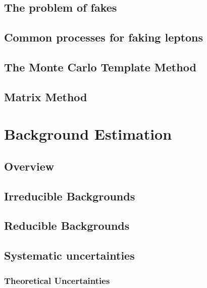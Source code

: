 \documentclass{outhesis}
\begin{document}
\section{The problem of fakes}\label{sec:fake.prob}

\section{Common processes for faking leptons}\label{sec:fake.proc}

\section{The Monte Carlo Template Method}\label{sec:fake.mct}

\section{Matrix Method}\label{sec:fake.mxm}


\chapter{Background Estimation}\label{chap:bkg}
\graphicspath{{figures/bkg/}}
\section{Overview}\label{sec:bkg.overview}

\section{Irreducible Backgrounds}\label{sec:bkg.irred}

\section{Reducible Backgrounds}\label{sec:bkg.red}

\section{Systematic uncertainties}\label{chap:syst}

\subsection{Theoretical Uncertainties}\label{sec:syst.theory}

\end{document}
